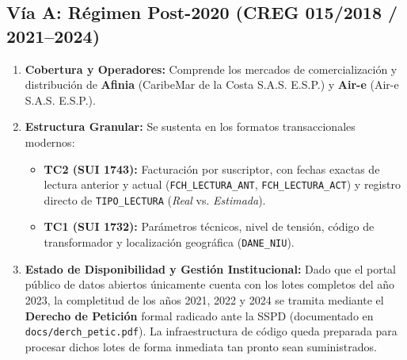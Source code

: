 \documentclass[11pt,a4paper]{article}
\begin{document}
\subsection{Vía A: Régimen Post-2020 (CREG 015/2018 / 2021--2024)}
\begin{enumerate}[label=\alph*.]
    \item \textbf{Cobertura y Operadores:} Comprende los mercados de comercialización y distribución 
    de \textbf{Afinia} (CaribeMar de la Costa S.A.S. E.S.P.) y \textbf{Air-e} (Air-e S.A.S. E.S.P.).
    \item \textbf{Estructura Granular:} Se sustenta en los formatos transaccionales modernos:
    \begin{itemize}
        \item \textbf{TC2 (SUI 1743):} Facturación por suscriptor, con fechas exactas de lectura anterior y actual 
        (\texttt{FCH\_LECTURA\_ANT}, \texttt{FCH\_LECTURA\_ACT}) y registro directo de \texttt{TIPO\_LECTURA} (\textit{Real} vs. \textit{Estimada}).
        \item \textbf{TC1 (SUI 1732):} Parámetros técnicos, nivel de tensión, código de transformador y localización geográfica (\texttt{DANE\_NIU}).
    \end{itemize}
    \item \textbf{Estado de Disponibilidad y Gestión Institucional:} Dado que el portal público de datos 
    abiertos únicamente cuenta con los lotes completos del año 2023, la completitud de los años 
    2021, 2022 y 2024 se tramita mediante el \textbf{Derecho de Petición} formal radicado ante la SSPD 
    (documentado en \texttt{docs/derch\_petic.pdf}). La infraestructura de código queda preparada para procesar 
    dichos lotes de forma inmediata tan pronto sean suministrados.
\end{enumerate}
\end{document}
